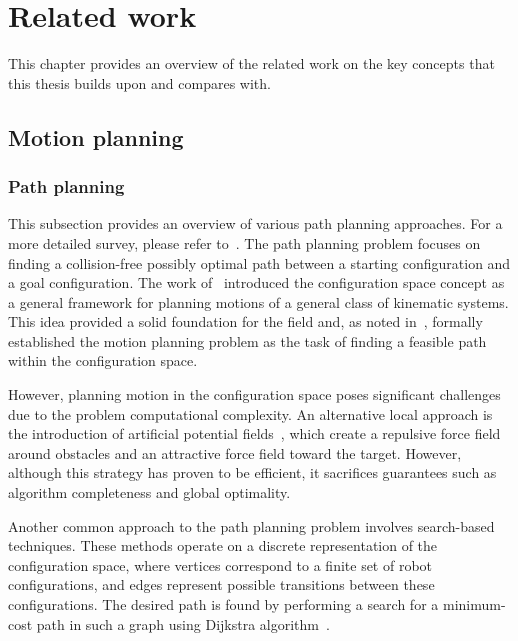 \chapter{Related work}\label{chap:related_work}

This chapter provides an overview of the related work on the key concepts that this thesis builds upon and compares with.

\section{Motion planning}

\subsection{Path planning}

This subsection provides an overview of various path planning approaches. 
For a more detailed survey, please refer to~\cite{cLavalle, cFrazzoli, cKavraki}.
The path planning problem focuses on finding a collision-free possibly optimal path between a starting configuration and a goal configuration. 
The work of~\cite{cConfigSpace} introduced the configuration space concept as a general framework for planning motions of a general class of kinematic systems.
This idea provided a solid foundation for the field and, as noted in~\cite{cSpatialPlan}, formally established the motion planning problem as the task of finding a feasible path within the configuration space.

However, planning motion in the configuration space poses significant challenges due to the problem computational complexity. 
An alternative local approach is the introduction of artificial potential fields~\cite{cAPF}, which create a repulsive force field around obstacles and an attractive force field toward the target.
However, although this strategy has proven to be efficient, it sacrifices guarantees such as algorithm completeness and global optimality.

Another common approach to the path planning problem involves search-based techniques. 
These methods operate on a discrete representation of the configuration space, where vertices correspond to a finite set of robot configurations, and edges represent possible transitions between these configurations.
The desired path is found by performing a search for a minimum-cost path in such a graph using Dijkstra algorithm~\cite{cDijk}. 

